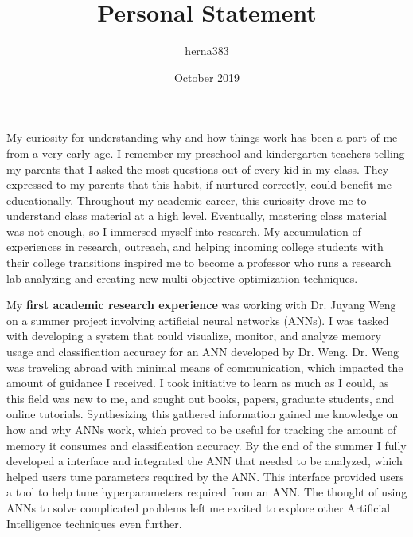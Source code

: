 \documentclass[12pt]{report}
\title{Personal Statement}
\author{herna383}
\date{October 2019}
\begin{document}

My curiosity for understanding why and how things work has been a part of me from a very early age. 
I remember my preschool and kindergarten teachers telling my parents that I asked the most questions out of every kid in my class. 
They expressed to my parents that this habit, if nurtured correctly, could benefit me educationally.
Throughout my academic career, this curiosity drove me to understand class material at a high level.
Eventually, mastering class material was not enough, so I immersed myself into research.
My accumulation of experiences in research, outreach, and helping incoming college students with their college transitions inspired me to become a professor who runs a research lab analyzing and creating new multi-objective optimization techniques.

My \textbf{first academic research experience} was working with Dr. Juyang Weng on a summer project involving artificial neural networks (ANNs).
I was tasked with developing a system that could visualize, monitor, and analyze memory usage and classification accuracy for an ANN developed by Dr. Weng. 
Dr. Weng was traveling abroad with minimal means of communication, which impacted the amount of guidance I received.
I took initiative to learn as much as I could, as this field was new to me, and sought out books, papers, graduate students, and online tutorials.
Synthesizing this gathered information gained me knowledge on how and why ANNs work, which proved to be useful for tracking the amount of memory it consumes and classification accuracy.
By the end of the summer I fully developed a interface and integrated the ANN that needed to be analyzed, which helped users tune parameters required by the ANN.
This interface provided users a tool to help tune hyperparameters required from an ANN.  
The thought of using ANNs to solve complicated problems left me excited to explore other Artificial Intelligence techniques even further. 
\end{document}
